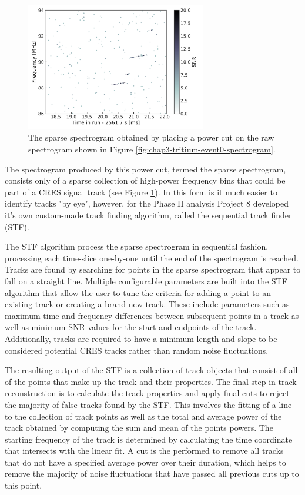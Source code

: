 \begin{figure}[htbp]
    \centering
    \includegraphics*[width=0.7\textwidth]{figs/Chapter-3/230621_t_event_zero_sparse_spectrogram_zoom.pdf}
    \caption{\label{fig:chap3-sparse-spectrogram} The sparse spectrogram obtained by placing a power cut on the raw spectrogram shown in Figure \ref{fig:chap3-tritium-event0-spectrogram}.}
\end{figure}

The spectrogram produced by this power cut, termed the sparse spectrogram, consists only of a sparse collection of high-power frequency bins that could be part of a CRES signal track (see Figure \ref{fig:chap3-sparse-spectrogram}). In this form is it much easier to identify tracks "by eye", however, for the Phase II analysis Project 8 developed it's own custom-made track finding algorithm, called the sequential track finder (STF). 

The STF algorithm process the sparse spectrogram in sequential fashion, processing each time-slice one-by-one until the end of the spectrogram is reached. Tracks are found by searching for points in the sparse spectrogram that appear to fall on a straight line. Multiple configurable parameters are built into the STF algorithm that allow the user to tune the criteria for adding a point to an existing track or creating a brand new track. These include parameters such as maximum time and frequency differences between subsequent points in a track as well as minimum SNR values for the start and endpoints of the track. Additionally, tracks are required to have a minimum length and slope to be considered potential CRES tracks rather than random noise fluctuations. 

The resulting output of the STF is a collection of track objects that consist of all of the points that make up the track and their properties. The final step in track reconstruction is to calculate the track properties and apply final cuts to reject the majority of false tracks found by the STF. This involves the fitting of a line to the collection of track points as well as the total and average power of the track obtained by computing the sum and mean of the points powers. The starting frequency of the track is determined by calculating the time coordinate that  intersects with the linear fit. A cut is the performed to remove all tracks that do not have a specified average power over their duration, which helps to remove the majority of noise fluctuations that have passed all previous cuts up to this point.

